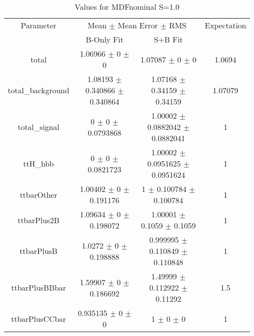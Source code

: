 \begin{table}
\centering
\caption{Values for MDFnominal S=1.0}
\begin{tabular}{cccc}
\toprule
Parameter & \multicolumn{2}{c}{Mean $\pm$ Mean Error $\pm$ RMS} & Expectation\\
 & B-Only Fit & S+B Fit & \\
\midrule
total & \num{1.06966} $\pm$ \num{0} $\pm$ \num{0} & \num{1.07087} $\pm$ \num{0} $\pm$ \num{0} & \num{1.0694}\\
total\_background & \num{1.08193} $\pm$ \num{0.340866} $\pm$ \num{0.340864} & \num{1.07168} $\pm$ \num{0.34159} $\pm$ \num{0.34159} & \num{1.07079}\\
total\_signal & \num{0} $\pm$ \num{0} $\pm$ \num{0.0793868} & \num{1.00002} $\pm$ \num{0.0882042} $\pm$ \num{0.0882041} & \num{1}\\
ttH\_hbb & \num{0} $\pm$ \num{0} $\pm$ \num{0.0821723} & \num{1.00002} $\pm$ \num{0.0951625} $\pm$ \num{0.0951624} & \num{1}\\
ttbarOther & \num{1.00402} $\pm$ \num{0} $\pm$ \num{0.191176} & \num{1} $\pm$ \num{0.100784} $\pm$ \num{0.100784} & \num{1}\\
ttbarPlus2B & \num{1.09634} $\pm$ \num{0} $\pm$ \num{0.198072} & \num{1.00001} $\pm$ \num{0.1059} $\pm$ \num{0.1059} & \num{1}\\
ttbarPlusB & \num{1.0272} $\pm$ \num{0} $\pm$ \num{0.198888} & \num{0.999995} $\pm$ \num{0.110849} $\pm$ \num{0.110848} & \num{1}\\
ttbarPlusBBbar & \num{1.59907} $\pm$ \num{0} $\pm$ \num{0.186692} & \num{1.49999} $\pm$ \num{0.112922} $\pm$ \num{0.11292} & \num{1.5}\\
ttbarPlusCCbar & \num{0.935135} $\pm$ \num{0} $\pm$ \num{0} & \num{1} $\pm$ \num{0} $\pm$ \num{0} & \num{1}\\
\bottomrule
\end{tabular}
\end{table}